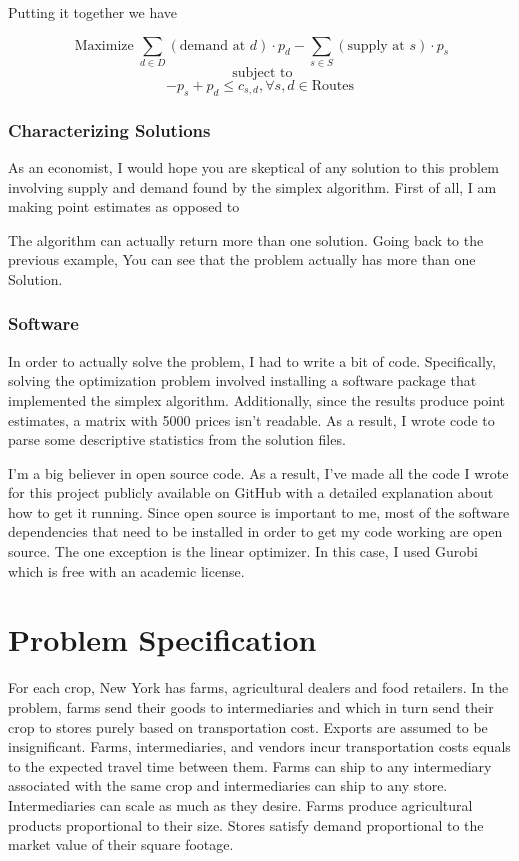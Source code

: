 \documentclass{report}
\begin{document}
Putting it together we have

$$\operatorname{Maximize} \sum_{d \in D}  (\text{demand at } d) \cdot p_{d} -   \sum_{s \in S}  (\text{supply at } s) \cdot p_{s} $$
$$ \text{ subject to}$$
$$ -p_s + p_d \leq c_{s,d}, \forall s,d\in \textrm{Routes}$$

\subsection{Characterizing Solutions}

As an economist, I would hope you are skeptical of any solution to this problem involving supply and demand found by the simplex algorithm. First of all, I am making point estimates as opposed to 

The algorithm can actually return more than one solution. Going back to the previous example, You can see that the problem actually has more than one Solution.


\subsection{Software}
In order to actually solve the problem, I had to write a bit of code. Specifically, solving the optimization problem involved installing a software package that implemented the simplex algorithm. Additionally, since the results produce point estimates, a matrix with 5000 prices isn't readable. As a result, I wrote code to parse some descriptive statistics from the solution files.

I'm a big believer in open source code. As a result, I've made all the code I wrote for this project publicly available on GitHub with a detailed explanation about how to get it running. Since open source is important to me, most of the software dependencies that need to be installed in order to get my code working are open source. The one exception is the linear optimizer. In this case, I used Gurobi which is free with an academic license.

\chapter{Problem Specification}

For each crop, New York has farms, agricultural dealers and food retailers. In the problem, farms send their goods to intermediaries and which in turn send their crop to stores purely based on transportation cost. Exports are assumed to be insignificant. Farms, intermediaries, and vendors incur transportation costs equals to the expected travel time between them. Farms can ship to any intermediary associated with the same crop and intermediaries can ship to any store. Intermediaries can scale as much as they desire. Farms produce agricultural products proportional to their size. Stores satisfy demand proportional to the market value of their square footage. 
\end{document}

